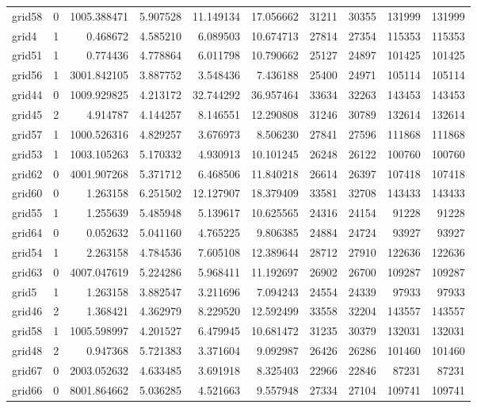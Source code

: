 \begin{longtable}{|l|r|r|r|r|r|r|r|r|r|}
grid58 & 0 & 1005.388471 & 5.907528 & 11.149134 & 17.056662 & 31211 & 30355 & 131999 & 131999 \\
grid4 & 1 & 0.468672 & 4.585210 & 6.089503 & 10.674713 & 27814 & 27354 & 115353 & 115353 \\
grid51 & 1 & 0.774436 & 4.778864 & 6.011798 & 10.790662 & 25127 & 24897 & 101425 & 101425 \\
grid56 & 1 & 3001.842105 & 3.887752 & 3.548436 & 7.436188 & 25400 & 24971 & 105114 & 105114 \\
grid44 & 0 & 1009.929825 & 4.213172 & 32.744292 & 36.957464 & 33634 & 32263 & 143453 & 143453 \\
grid45 & 2 & 4.914787 & 4.144257 & 8.146551 & 12.290808 & 31246 & 30789 & 132614 & 132614 \\
grid57 & 1 & 1000.526316 & 4.829257 & 3.676973 & 8.506230 & 27841 & 27596 & 111868 & 111868 \\
grid53 & 1 & 1003.105263 & 5.170332 & 4.930913 & 10.101245 & 26248 & 26122 & 100760 & 100760 \\
grid62 & 0 & 4001.907268 & 5.371712 & 6.468506 & 11.840218 & 26614 & 26397 & 107418 & 107418 \\
grid60 & 0 & 1.263158 & 6.251502 & 12.127907 & 18.379409 & 33581 & 32708 & 143433 & 143433 \\
grid55 & 1 & 1.255639 & 5.485948 & 5.139617 & 10.625565 & 24316 & 24154 & 91228 & 91228 \\
grid64 & 0 & 0.052632 & 5.041160 & 4.765225 & 9.806385 & 24884 & 24724 & 93927 & 93927 \\
grid54 & 1 & 2.263158 & 4.784536 & 7.605108 & 12.389644 & 28712 & 27910 & 122636 & 122636 \\
grid63 & 0 & 4007.047619 & 5.224286 & 5.968411 & 11.192697 & 26902 & 26700 & 109287 & 109287 \\
grid5 & 1 & 1.263158 & 3.882547 & 3.211696 & 7.094243 & 24554 & 24339 & 97933 & 97933 \\
grid46 & 2 & 1.368421 & 4.362979 & 8.229520 & 12.592499 & 33558 & 32204 & 143557 & 143557 \\
grid58 & 1 & 1005.598997 & 4.201527 & 6.479945 & 10.681472 & 31235 & 30379 & 132031 & 132031 \\
grid48 & 2 & 0.947368 & 5.721383 & 3.371604 & 9.092987 & 26426 & 26286 & 101460 & 101460 \\
grid67 & 0 & 2003.052632 & 4.633485 & 3.691918 & 8.325403 & 22966 & 22846 & 87231 & 87231 \\
grid66 & 0 & 8001.864662 & 5.036285 & 4.521663 & 9.557948 & 27334 & 27104 & 109741 & 109741 \\

\end{longtable}
